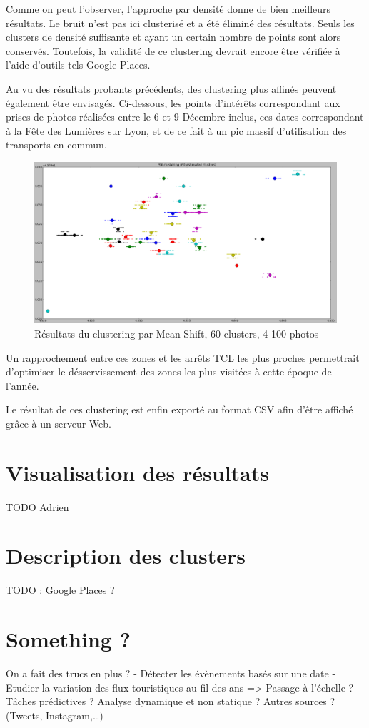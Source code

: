 Comme on peut l'observer, l'approche par densité donne de bien meilleurs résultats. Le bruit n'est pas ici clusterisé et a été éliminé des résultats. Seuls les clusters de densité suffisante et ayant un certain nombre de points sont alors conservés. Toutefois, la validité de ce clustering devrait encore être vérifiée à l'aide d'outils tels Google Places.


Au vu des résultats probants précédents, des clustering plus affinés peuvent également être envisagés. Ci-dessous, les points d'intérêts correspondant aux prises de photos réalisées entre le 6 et 9 Décembre inclus, ces dates correspondant à la Fête des Lumières sur Lyon, et de ce fait à un pic massif d'utilisation des transports en commun.
\begin{figure}[H]
    \centering
    \includegraphics[width=\linewidth]{img/meanshift_lumieres.png}
    \caption{Résultats du clustering par Mean Shift, 60 clusters, 4 100 photos}
\end{figure}

Un rapprochement entre ces zones et les arrêts TCL les plus proches permettrait d'optimiser le désservissement des zones les plus visitées à cette époque de l'année.

Le résultat de ces clustering est enfin exporté au format CSV afin d'être affiché grâce à un serveur Web.
\pagebreak



\section{Visualisation des résultats}
TODO Adrien
\pagebreak


\section{Description des clusters}
TODO : Google Places ?
\pagebreak


\section{Something ?}
On a fait des trucs en plus ?
- Détecter les évènements basés sur une date
- Etudier la variation des flux touristiques au fil des ans
=> Passage à l’échelle ? Tâches prédictives ? Analyse dynamique et non statique ? Autres sources ? (Tweets, Instagram,…)
\pagebreak
